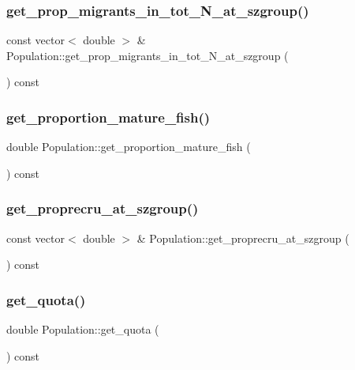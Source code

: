 \subsubsection{\texorpdfstring{get\_prop\_migrants\_in\_tot\_N\_at\_szgroup()}{get\_prop\_migrants\_in\_tot\_N\_at\_szgroup()}}
{\footnotesize\ttfamily const vector$<$ double $>$ \& Population\+::get\+\_\+prop\+\_\+migrants\+\_\+in\+\_\+tot\+\_\+\+N\+\_\+at\+\_\+szgroup (\begin{DoxyParamCaption}{ }\end{DoxyParamCaption}) const}

\mbox{\label{class_population_a0425f54c30084fdc60e2824c3bc185e7}} 
\subsubsection{\texorpdfstring{get\_proportion\_mature\_fish()}{get\_proportion\_mature\_fish()}}
{\footnotesize\ttfamily double Population\+::get\+\_\+proportion\+\_\+mature\+\_\+fish (\begin{DoxyParamCaption}{ }\end{DoxyParamCaption}) const}

\mbox{\label{class_population_a25243972da373b5d43507b5d532ced35}} 
\subsubsection{\texorpdfstring{get\_proprecru\_at\_szgroup()}{get\_proprecru\_at\_szgroup()}}
{\footnotesize\ttfamily const vector$<$ double $>$ \& Population\+::get\+\_\+proprecru\+\_\+at\+\_\+szgroup (\begin{DoxyParamCaption}{ }\end{DoxyParamCaption}) const}

\mbox{\label{class_population_a796affd235f53baa7a3aa6093726a6dc}} 
\subsubsection{\texorpdfstring{get\_quota()}{get\_quota()}}
{\footnotesize\ttfamily double Population\+::get\+\_\+quota (\begin{DoxyParamCaption}{ }\end{DoxyParamCaption}) const}

